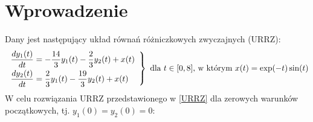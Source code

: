 \documentclass[a4paper, 12pt, twoside, openany]{article}
\begin{document}
    \section{Wprowadzenie}
    Dany jest następujący układ równań różniczkowych zwyczajnych (URRZ):
    \begin{equation}
        \label{URRZ}
        \left.\begin{array}{c}
            \begin{aligned}
                \frac{dy_1(t)}{dt} &= -\frac{14}{3}y_1(t) - \frac{2}{3}y_2(t) + x(t) \\
                \frac{dy_2(t)}{dt} &= \frac{2}{3}y_1(t) - \frac{19}{3}y_2(t) + x(t)
            \end{aligned}
        \end{array}\right\}
        \text{ dla } t\in[0,8] \text{, w którym } x(t) = \exp(-t)\sin(t) \\
    \end{equation}
    W celu rozwiązania URRZ przedstawionego w \eqref{URRZ} dla zerowych warunków
    początkowych, tj. $y_1(0) = y_2(0) = 0$:
\end{document}
